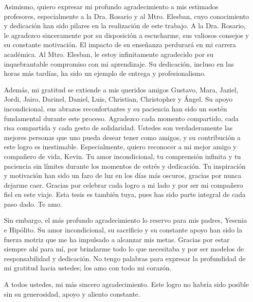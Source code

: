 Asimismo, quiero expresar mi profundo agradecimiento a mis estimados profesores, especialmente a la Dra. Rosario y al Mtro. Elesban, cuyo conocimiento y dedicación han sido pilares en la realización de este trabajo. A la Dra. Rosario, le agradezco sinceramente por su disposición a escucharme, sus valiosos consejos y su constante motivación. El impacto de su enseñanza perdurará en mi carrera académica. Al Mtro. Elesban, le estoy infinitamente agradecido por su inquebrantable compromiso con mi aprendizaje. Su dedicación, incluso en las horas más tardías, ha sido un ejemplo de entrega y profesionalismo.

Además, mi gratitud se extiende a mis queridos amigos Gustavo, Mara, Jaziel, Jordi, Jairo, Darinel, Daniel, Luis, Christian, Christopher y Ángel. Su apoyo incondicional, sus abrazos reconfortantes y su paciencia han sido un sostén fundamental durante este proceso. Agradezco cada momento compartido, cada risa compartida y cada gesto de solidaridad. Ustedes son verdaderamente las mejores personas que uno pueda desear tener como amigos, y su contribución a este logro es inestimable. Especialmente, quiero reconocer a mi mejor amigo y compañero de vida, Kevin. Tu amor incondicional, tu comprensión infinita y tu paciencia sin límites durante los momentos de estrés y dedicación. Tu inspiración y motivación han sido un faro de luz en los días más oscuros, gracias por nunca dejarme caer. Gracias por celebrar cada logro a mi lado y por ser mi compañero fiel en este viaje. Esta tesis es también tuya, pues has sido parte integral de cada paso dado. Te amo.

Sin embargo, el más profundo agradecimiento lo reservo para mis padres, Yesenia e Hipólito. Su amor incondicional, su sacrificio y su constante apoyo han sido la fuerza motriz que me ha impulsado a alcanzar mis metas. Gracias por estar siempre ahí para mí, por brindarme todo lo que necesitaba y por ser modelos de responsabilidad y dedicación. No tengo palabras para expresar la profundidad de mi gratitud hacia ustedes; los amo con todo mi corazón.

A todos ustedes, mi más sincero agradecimiento. Este logro no habría sido posible sin su generosidad, apoyo y aliento constante.
